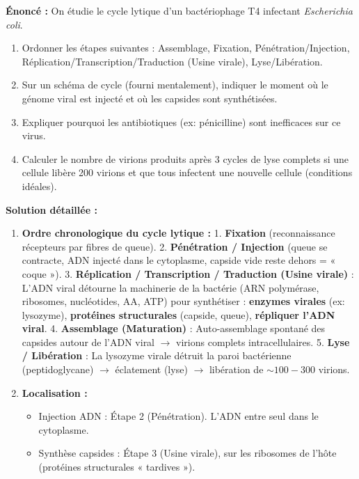 \documentclass[11pt]{article}
\begin{document}
\begin{exoresolu}
    \textbf{Énoncé :} On étudie le cycle lytique d'un bactériophage T4 infectant \emph{Escherichia coli}.
    \begin{enumerate}
        \item Ordonner les étapes suivantes : Assemblage, Fixation, Pénétration/Injection, Réplication/Transcription/Traduction (Usine virale), Lyse/Libération.
        \item Sur un schéma de cycle (fourni mentalement), indiquer le moment où le génome viral est injecté et où les capsides sont synthétisées.
        \item Expliquer pourquoi les antibiotiques (ex: pénicilline) sont inefficaces sur ce virus.
        \item Calculer le nombre de virions produits après 3 cycles de lyse complets si une cellule libère 200 virions et que tous infectent une nouvelle cellule (conditions idéales).
    \end{enumerate}
    \tcblower
    \textbf{Solution détaillée :}
    \begin{enumerate}
        \item \textbf{Ordre chronologique du cycle lytique :}
              1. \textbf{Fixation} (reconnaissance récepteurs par fibres de queue).
              2. \textbf{Pénétration / Injection} (queue se contracte, ADN injecté dans le cytoplasme, capside vide reste dehors = « coque »).
              3. \textbf{Réplication / Transcription / Traduction (Usine virale)} : L'ADN viral détourne la machinerie de la bactérie (ARN polymérase, ribosomes, nucléotides, AA, ATP) pour synthétiser : \textbf{enzymes virales} (ex: lysozyme), \textbf{protéines structurales} (capside, queue), \textbf{répliquer l'ADN viral}.
              4. \textbf{Assemblage (Maturation)} : Auto-assemblage spontané des capsides autour de l'ADN viral $\rightarrow$ virions complets intracellulaires.
              5. \textbf{Lyse / Libération} : La lysozyme virale détruit la paroi bactérienne (peptidoglycane) $\rightarrow$ éclatement (lyse) $\rightarrow$ libération de $\sim 100-300$ virions.
        \item \textbf{Localisation :}
              \begin{itemize}
                  \item Injection ADN : Étape 2 (Pénétration). L'ADN entre seul dans le cytoplasme.
                  \item Synthèse capsides : Étape 3 (Usine virale), sur les ribosomes de l'hôte (protéines structurales « tardives »).

\end{itemize}
\end{enumerate}
\end{exoresolu}
\end{document}
